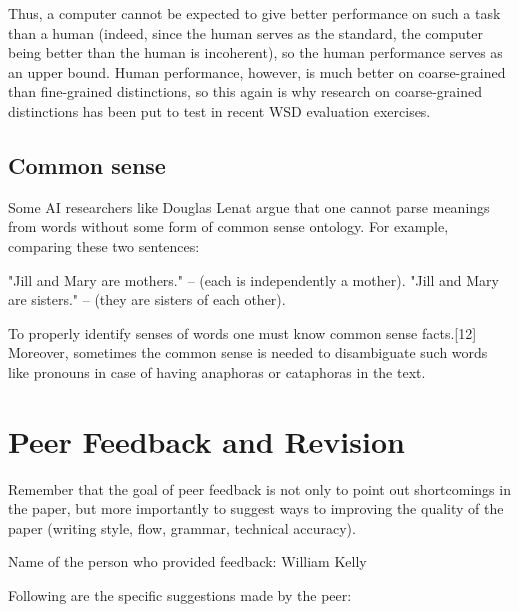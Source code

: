 \documentclass[11pt]{article}
\begin{document}
Thus, a computer cannot be expected to give better performance on such a task than a human (indeed, since the human serves as the standard, the computer being better than the human is incoherent), so the human performance serves as an upper bound. Human performance, however, is much better on coarse-grained than fine-grained distinctions, so this again is why research on coarse-grained distinctions has been put to test in recent WSD evaluation exercises.

\nocite{Liu:2000:WSD:974456.974463,Seemakurty:2010:WSD:1837885.1837905}
\printbibliography
\endrefsection




\subsection{Common sense}

Some AI researchers like Douglas Lenat argue that one cannot parse meanings from words without some form of common sense ontology. For example, comparing these two sentences:

	"Jill and Mary are mothers." – (each is independently a mother).
	"Jill and Mary are sisters." – (they are sisters of each other).

To properly identify senses of words one must know common sense facts.[12] Moreover, sometimes the common sense is needed to disambiguate such words like pronouns in case of having anaphoras or cataphoras in the text.

\nocite{Brown:1991:WDU:981344.981378,McCarthy:2004:FPW:1218955.1218991,singh2002open}
\printbibliography
\endrefsection




\section{Peer Feedback and Revision} \label{sec:peer}

Remember that the goal of peer feedback is not only to point out shortcomings in the paper, but more importantly to suggest ways to improving the quality of the paper (writing style, flow, grammar, technical accuracy). 

\noindent Name of the person who provided feedback: William Kelly

Following are the specific suggestions made by the peer:
\end{document}
